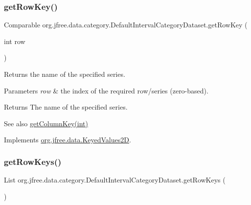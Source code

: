 \subsubsection{\texorpdfstring{get\+Row\+Key()}{getRowKey()}}
{\footnotesize\ttfamily Comparable org.\+jfree.\+data.\+category.\+Default\+Interval\+Category\+Dataset.\+get\+Row\+Key (\begin{DoxyParamCaption}\item[{int}]{row }\end{DoxyParamCaption})}

Returns the name of the specified series.


\begin{DoxyParams}{Parameters}
{\em row} & the index of the required row/series (zero-\/based).\\
\hline
\end{DoxyParams}
\begin{DoxyReturn}{Returns}
The name of the specified series.
\end{DoxyReturn}
\begin{DoxySeeAlso}{See also}
\mbox{\hyperlink{classorg_1_1jfree_1_1data_1_1category_1_1_default_interval_category_dataset_a522cac1ea57092736c3a2212e97e56b9}{get\+Column\+Key(int)}} 
\end{DoxySeeAlso}


Implements \mbox{\hyperlink{interfaceorg_1_1jfree_1_1data_1_1_keyed_values2_d_a7c145e2383036a479460e4bca7b40a95}{org.\+jfree.\+data.\+Keyed\+Values2D}}.

\mbox{\label{classorg_1_1jfree_1_1data_1_1category_1_1_default_interval_category_dataset_aa8a0a871f4557e0ef292fe5e9db0d55b}} 
\subsubsection{\texorpdfstring{get\+Row\+Keys()}{getRowKeys()}}
{\footnotesize\ttfamily List org.\+jfree.\+data.\+category.\+Default\+Interval\+Category\+Dataset.\+get\+Row\+Keys (\begin{DoxyParamCaption}{ }\end{DoxyParamCaption})}

